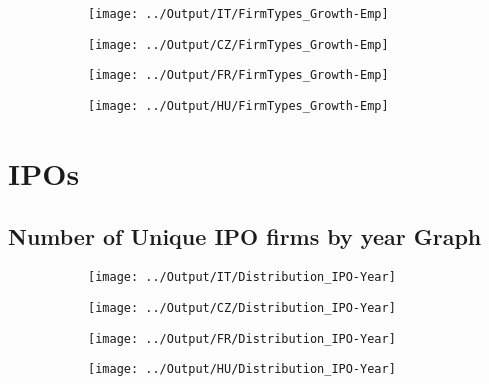 \documentclass[12pt,notitlepage]{article}
\begin{document}
\begin{figure}[!htpb]
\centering
\caption{Firm types and growth in Employment}
\begin{subfigure}{.49\textwidth}
    \centering
 \texttt{[image: ../Output/IT/FirmTypes\_Growth-Emp]}
\end{subfigure}%
\begin{subfigure}{.49\textwidth}
    \centering
 \texttt{[image: ../Output/CZ/FirmTypes\_Growth-Emp]}
\end{subfigure}
\begin{subfigure}{.49\textwidth}
    \centering
 \texttt{[image: ../Output/FR/FirmTypes\_Growth-Emp]}
\end{subfigure}%
\begin{subfigure}{.49\textwidth}
    \centering
 \texttt{[image: ../Output/HU/FirmTypes\_Growth-Emp]}
\end{subfigure}
\end{figure}
\pagebreak



\FloatBarrier
\section{IPOs} %
\label{sec:ipos}
\FloatBarrier




\subsection{Number of Unique IPO firms by year Graph}

\begin{figure}[!htpb]
\centering
\caption{Distribution of IPO by year}
\begin{subfigure}{.49\textwidth}
    \centering
 \texttt{[image: ../Output/IT/Distribution\_IPO-Year]}
\end{subfigure}%
\begin{subfigure}{.49\textwidth}
    \centering
 \texttt{[image: ../Output/CZ/Distribution\_IPO-Year]}
\end{subfigure}
\begin{subfigure}{.49\textwidth}
    \centering
 \texttt{[image: ../Output/FR/Distribution\_IPO-Year]}
\end{subfigure}%
\begin{subfigure}{.49\textwidth}
    \centering
 \texttt{[image: ../Output/HU/Distribution\_IPO-Year]}
\end{subfigure}
\end{figure}
\pagebreak
\end{document}
